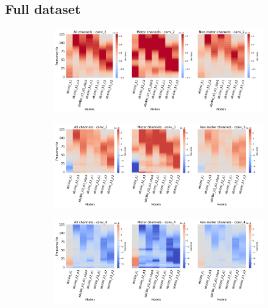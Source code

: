 \subsection*{Full dataset}\label{subsec:absVel-full-dataset-appendixD}
\begin{figure}[!htpb]
\centering
\begin{subfigure}[b]{\textwidth}
   \includegraphics[width=1\linewidth]{img/appendix/D/conv-2/m/absVel_model_gradients_all_kinds}
   \caption{}
   \label{fig:absVel-pw-full-grads-conv-2}
\end{subfigure}

\begin{subfigure}[b]{\textwidth}
   \includegraphics[width=1\linewidth]{img/appendix/D/conv-3/m/absVel_model_gradients_all_kinds}
   \caption{}
   \label{fig:absVel-pw-full-grads-conv-3}
\end{subfigure}

\begin{subfigure}[b]{\textwidth}
   \includegraphics[width=1\linewidth]{img/appendix/D/conv-4/m/absVel_model_gradients_all_kinds}
   \caption{}
   \label{fig:absVel-pw-full-grads-conv-4}
\end{subfigure}


\end{figure}
